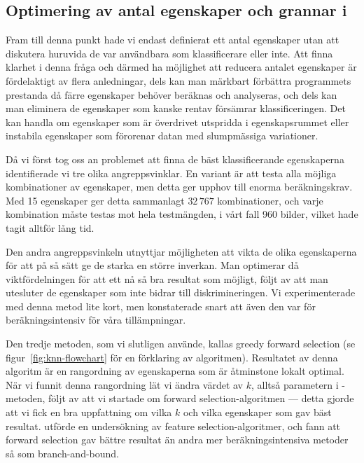 \documentclass[../rapport_MVEX01-11-05]{subfiles}
\begin{document}
\subsection{Optimering av antal egenskaper och grannar i \knn}
Fram till denna punkt hade vi endast definierat ett antal egenskaper utan att
diskutera huruvida de var användbara som klassificerare eller inte. Att finna
klarhet i denna fråga och därmed ha möjlighet att reducera antalet egenskaper är
fördelaktigt av flera anledningar, dels kan man märkbart förbättra programmets
prestanda då färre egenskaper behöver beräknas och analyseras, och dels kan man
eliminera de egenskaper som kanske rentav försämrar klassificeringen.
Det kan handla om egenskaper som är överdrivet utspridda i
egenskapsrummet eller instabila egenskaper som förorenar datan med slumpmässiga
variationer.

Då vi först tog oss an problemet att finna de bäst klassificerande
egenskaperna identifierade vi tre olika angreppsvinklar. En variant är att
testa alla möjliga kombinationer av egenskaper,
men detta ger upphov till enorma beräkningskrav. Med 15
egenskaper ger detta sammanlagt $32\,767$ kombinationer, och varje kombination
måste testas mot hela testmängden, i vårt fall 960 bilder, vilket hade tagit
alltför lång tid.
 
Den andra angreppsvinkeln utnyttjar
möjligheten att vikta de olika egenskaperna för att på så sätt ge de starka en
större inverkan. Man optimerar då
viktfördelningen för att ett nå så bra resultat som möjligt, följt av att man
utesluter de egenskaper som inte bidrar till diskrimineringen. Vi experimenterade
med denna metod lite kort, men konstaterade snart att även den var för 
beräkningsintensiv för våra tillämpningar.

Den tredje metoden, som vi slutligen 
använde, kallas greedy forward selection (se
 figur~\ref{fig:knn-flowchart} för en förklaring av algoritmen).
Resultatet av denna algoritm är en rangordning av egenskaperna som är
åtminstone lokalt optimal. När vi funnit denna rangordning
lät vi ändra värdet av $k$, alltså parametern i \knn-metoden, följt av
att vi startade om forward selection-algoritmen --- detta gjorde att vi
fick en bra uppfattning om vilka $k$ och vilka egenskaper som gav bäst resultat.
 utförde en undersökning av feature selection-algoritmer,
och fann att forward selection gav bättre resultat än andra mer beräkningsintensiva
metoder så som branch-and-bound.
\end{document}
